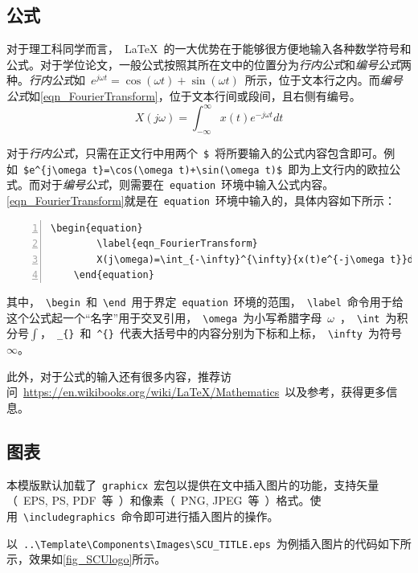 \subsection{公式}
\label{Subsect_InsertFormula}
对于理工科同学而言，~\LaTeX~的一大优势在于能够很方便地输入各种数学符号和公式。对于学位论文，一般公式按照其所在文中的位置分为\emph{行内公式}和\emph{编号公式}两种。\emph{行内公式}如~$e^{j\omega t}=\cos(\omega t)+\sin(\omega t)$~所示，位于文本行之内。而\emph{编号公式}如\cref{eqn_FourierTransform}，位于文本行间或段间，且右侧有编号。
\begin{equation}
	\label{eqn_FourierTransform}
	X(j\omega)=\int_{-\infty}^{\infty}{x(t)e^{-j\omega t}}dt
\end{equation}


对于\emph{行内公式}，只需在正文行中用两个~\verb|$|~将所要输入的公式内容包含即可。例如~\verb|$e^{j\omega t}=\cos(\omega t)+\sin(\omega t)$|~即为上文行内的欧拉公式。而对于\emph{编号公式}，则需要在~\verb|equation|~环境中输入公式内容。\cref{eqn_FourierTransform}就是在~\verb|equation|~环境中输入的，具体内容如下所示：
\begin{Verbatim}[gobble=1,frame=single,numbers=left]
	\begin{equation}
		\label{eqn_FourierTransform}
		X(j\omega)=\int_{-\infty}^{\infty}{x(t)e^{-j\omega t}}dt
	\end{equation}
\end{Verbatim}
其中，~\verb|\begin|~和~\verb|\end|~用于界定~\verb|equation|~环境的范围，~\verb|\label|~命令用于给这个公式起一个“名字”用于交叉引用，~\verb|\omega|~为小写希腊字母~$\omega$~，~\verb|\int|~为积分号$\int$，~\verb|_{}|~和~\verb|^{}|~代表大括号中的内容分别为下标和上标，~\verb|\infty|~为符号$\infty$。


此外，对于公式的输入还有很多内容，推荐访问~\url{https://en.wikibooks.org/wiki/LaTeX/Mathematics}~以及参考，获得更多信息。

\subsection{图表}
\label{Subsect_InsertFigureTable}
本模版默认加载了~\verb|graphicx|~宏包以提供在文中插入图片的功能，支持矢量（~EPS, PS, PDF~等~）和像素（~PNG, JPEG~等~）格式。使用~\verb|\includegraphics|~命令即可进行插入图片的操作。


以~\verb|..\Template\Components\Images\SCU_TITLE.eps|~为例插入图片的代码如下所示，效果如\cref{fig_SCUlogo}所示。

